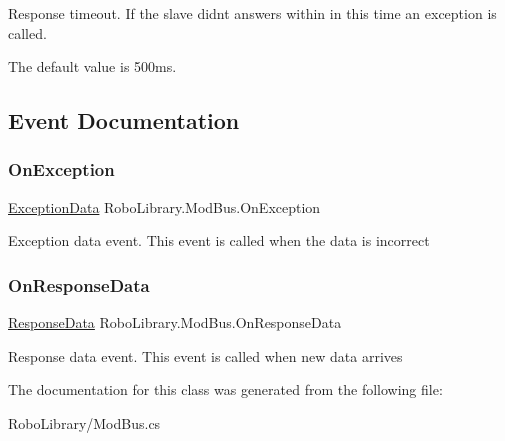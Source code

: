 Response timeout. If the slave didn\textquotesingle{}t answers within in this time an exception is called.

The default value is 500ms.

\subsection{Event Documentation}
\hypertarget{class_robo_library_1_1_mod_bus_af04afd761811816c0018a8788c33524f}{}\label{class_robo_library_1_1_mod_bus_af04afd761811816c0018a8788c33524f} 
\subsubsection{\texorpdfstring{On\+Exception}{OnException}}
{\footnotesize\ttfamily \hyperlink{class_robo_library_1_1_mod_bus_ac78341a28ded6af9cc33c594315e7c06}{Exception\+Data} Robo\+Library.\+Mod\+Bus.\+On\+Exception}



Exception data event. This event is called when the data is incorrect

\hypertarget{class_robo_library_1_1_mod_bus_a7b2d5617e91faf204d0c8454676353f3}{}\label{class_robo_library_1_1_mod_bus_a7b2d5617e91faf204d0c8454676353f3} 
\subsubsection{\texorpdfstring{On\+Response\+Data}{OnResponseData}}
{\footnotesize\ttfamily \hyperlink{class_robo_library_1_1_mod_bus_a497317cafb760023aef4af60fba95c0b}{Response\+Data} Robo\+Library.\+Mod\+Bus.\+On\+Response\+Data}



Response data event. This event is called when new data arrives



The documentation for this class was generated from the following file\+:\begin{DoxyCompactItemize}
\item 
Robo\+Library/Mod\+Bus.\+cs\end{DoxyCompactItemize}
